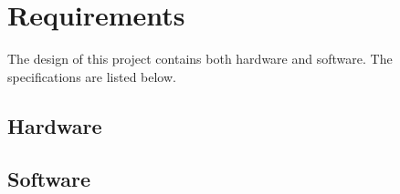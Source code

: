 \chapter{Requirements}
The design of this project contains both hardware and software. The specifications are listed below.

\section{Hardware}



\section{Software}

